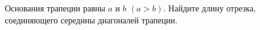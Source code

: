 \begin{ex}
	\begin{condition}
		Основания трапеции равны \( a \) и \( b  \) \( (a > b) \). Найдите длину отрезка, соединяющего середины диагоналей трапеции.
	\end{condition}
\end{ex}